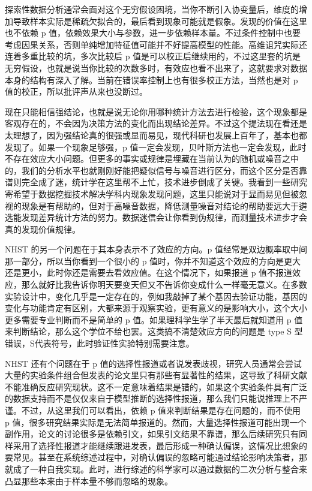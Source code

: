 \documentclass[]{tufte-book}
\begin{document}
探索性数据分析通常会面对这个无穷假设困境，当你不断引入协变量后，维度的增加导致样本实际是稀疏欠拟合的，最后看到现象可能就是假象。发现的价值在这里也不依赖 p 值，依赖效果大小与参数，进一步依赖样本量。不过条件控制中也要考虑因果关系，否则单纯增加特征值可能并不好提高模型的性能。高维诅咒实际还连着多重比较的坑，多次比较后 p 值是可以校正后继续用的，不过这里套的坑是无穷假设，也就是说当你比较的次数多时，有效应也看不出来了，这就要求对数据本身的结构有深入了解。当前在错误率控制上也有很多校正方法，当然也是对 p 值的校正，所以批评声从来也没断过。

现在只能相信强结论，也就是说无论你用哪种统计方法去进行检验，这个现象都是客观存在的，不会因为决策方法的变化而出现结论差异。不过这个提法现在看还是太理想了，因为强结论真的很强或显而易见，现代科研也发展上百年了，基本也都发现了。如果一个现象足够强，p 值一定会发现，贝叶斯方法也一定会发现，此时不存在效应大小问题。但更多的事实或规律是埋藏在当前认为的随机或噪音之中的，我们的分析水平也就刚刚好能把疑似信号与噪音进行区分，而这个区分是否靠谱则完全成了迷，统计学在这里帮不上忙，技术进步倒成了关键。我看到一些研究寄希望于数据挖掘技术解决学科内现象发现问题，这里只能说对于显而易见但被忽视的现象是有帮助的，但对于高噪音数据，降低测量噪音对结论的帮助要远大于遴选能发现差异统计方法的努力。数据迷信会让你看到伪规律，而测量技术进步才会真的发现价值规律。

NHST 的另一个问题在于其本身表示不了效应的方向。p 值经常是双边概率取中间那一部分，所以当你看到一个很小的 p 值时，你并不知道这个效应的方向是更大还是更小，此时你还是需要去看效应值。在这个情况下，如果报道 p 值不报道效应，那么就好比我告诉你明天要变天但又不告诉你变成什么一样毫无意义。在多数实验设计中，变化几乎是一定存在的，例如我敲掉了某个基因去验证功能，基因的变化与功能肯定有区别，大都来源于观察实验，更有意义的是影响大小，这个大小更多需要专业判断而不是简单的 p 值。如果理科学生学了半天最后就知道用 p 值来判断结论，那么这个学位不给也罢。这类搞不清楚效应方向的问题是 type S 型错误，S代表符号，此时验证性实验特别需要注意。

NHST 还有个问题在于 p 值的选择性报道或者说发表歧视，研究人员通常会尝试大量的实验条件组合但发表的论文里只有那些有显著性的结果，这导致了科研文献不能准确反应研究现状。这不一定意味着结果是错的，如果这个实验条件具有广泛的数据支持而不是仅仅来自于模型推断的选择性报道，那么我们只能说推理上不严谨。不过，从这里我们可以看出，依赖 p 值来判断结果是存在问题的，而不使用 p 值，很多研究结果实际是无法简单报道的。然而，大量选择性报道可能出现一个副作用，论文的讨论很多是依赖引文，如果引文结果不靠谱，那么后续研究只有同样采用了选择性报道才能继续跟进发表，最后形成一种确认偏误，这情况比想象的要常见。甚至在系统综述过程中，对确认偏误的忽略可能通过结论影响决策者，那就成了一种自我实现。此时，进行综述的科学家可以通过数据的二次分析与整合来凸显那些本来由于样本量不够而忽略的现象。
\end{document}
